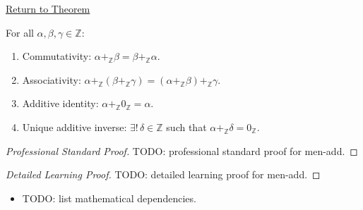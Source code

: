 \newpage
{}
\label{prf:men-add}

\begin{remark*}[Return]
\hyperref[thm:men-add]{Return to Theorem}
\end{remark*}

\begin{theorem*}
For all $\alpha, \beta, \gamma \in \mathbb{Z}$:
\begin{enumerate}
  \item[(i)] Commutativity: $\alpha +_{\mathbb{Z}} \beta
    = \beta +_{\mathbb{Z}} \alpha$.
  \item[(ii)] Associativity: $\alpha +_{\mathbb{Z}}
    (\beta +_{\mathbb{Z}} \gamma)
    = (\alpha +_{\mathbb{Z}} \beta) +_{\mathbb{Z}} \gamma$.
  \item[(iii)] Additive identity: $\alpha +_{\mathbb{Z}} 0_{\mathbb{Z}}
    = \alpha$.
  \item[(iv)] Unique additive inverse: $\exists!\,\delta \in \mathbb{Z}$
    such that $\alpha +_{\mathbb{Z}} \delta = 0_{\mathbb{Z}}$.
\end{enumerate}
\end{theorem*}

\begin{proof}[Professional Standard Proof]
\LRAProofBodyStart
TODO: professional standard proof for men-add.
\end{proof}

\begin{proof}[Detailed Learning Proof]
\LRAProofBodyStart
TODO: detailed learning proof for men-add.
\end{proof}

\begin{remark*}
\end{remark*}

\begin{dependencies}
\begin{itemize}
  \item TODO: list mathematical dependencies.
\end{itemize}
\end{dependencies}

\clearpage
